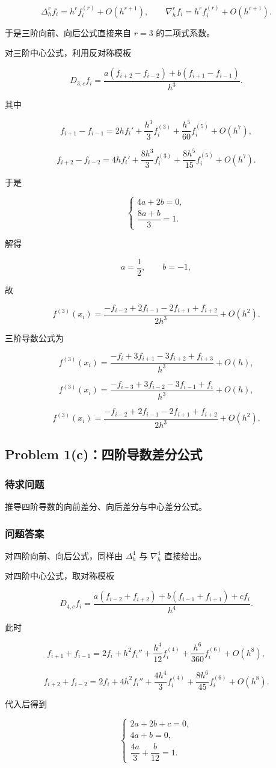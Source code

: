\documentclass[12pt,a4paper,fontset=none]{ctexart}
\newcommand{\problem}[1]{\subsection{#1}}
\newcommand{\blocktitle}[1]{\subsubsection{#1}}
\begin{document}
\[
\Delta_h^r f_i=h^r f_i^{(r)}+O(h^{r+1}),\qquad
\nabla_h^r f_i=h^r f_i^{(r)}+O(h^{r+1}).
\]

于是三阶向前、向后公式直接来自 \(r=3\) 的二项式系数。

对三阶中心公式，利用反对称模板

\[
D_{3,c}f_i
=\frac{a(f_{i+2}-f_{i-2})+b(f_{i+1}-f_{i-1})}{h^3}.
\]

其中

\[
f_{i+1}-f_{i-1}
=2h f_i'+\frac{h^3}{3}f_i^{(3)}+\frac{h^5}{60}f_i^{(5)}+O(h^7),
\]

\[
f_{i+2}-f_{i-2}
=4h f_i'+\frac{8h^3}{3}f_i^{(3)}+\frac{8h^5}{15}f_i^{(5)}+O(h^7).
\]

于是

\[
\begin{cases}
4a+2b=0,\\
\dfrac{8a+b}{3}=1.
\end{cases}
\]

解得

\[
a=\frac{1}{2},\qquad b=-1,
\]

故

\[
f^{(3)}(x_i)=\frac{-f_{i-2}+2f_{i-1}-2f_{i+1}+f_{i+2}}{2h^3}+O(h^2).
\]

三阶导数公式为

\[
f^{(3)}(x_i)=\frac{-f_i+3f_{i+1}-3f_{i+2}+f_{i+3}}{h^3}+O(h),
\]

\[
f^{(3)}(x_i)=\frac{-f_{i-3}+3f_{i-2}-3f_{i-1}+f_i}{h^3}+O(h),
\]

\[
f^{(3)}(x_i)=\frac{-f_{i-2}+2f_{i-1}-2f_{i+1}+f_{i+2}}{2h^3}+O(h^2).
\]


\problem{Problem 1(c)：四阶导数差分公式}

\blocktitle{待求问题}
推导四阶导数的向前差分、向后差分与中心差分公式。

\blocktitle{问题答案}
对四阶向前、向后公式，同样由 \(\Delta_h^4\) 与 \(\nabla_h^4\) 直接给出。

对四阶中心公式，取对称模板

\[
D_{4,c}f_i
=\frac{a(f_{i-2}+f_{i+2})+b(f_{i-1}+f_{i+1})+c f_i}{h^4}.
\]

此时

\[
f_{i+1}+f_{i-1}
=2f_i+h^2 f_i''+\frac{h^4}{12}f_i^{(4)}+\frac{h^6}{360}f_i^{(6)}+O(h^8),
\]

\[
f_{i+2}+f_{i-2}
=2f_i+4h^2 f_i''+\frac{4h^4}{3}f_i^{(4)}+\frac{8h^6}{45}f_i^{(6)}+O(h^8).
\]

代入后得到

\[
\begin{cases}
2a+2b+c=0,\\
4a+b=0,\\
\dfrac{4a}{3}+\dfrac{b}{12}=1.
\end{cases}
\]
\end{document}
